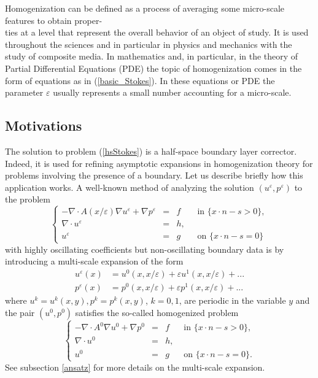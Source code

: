 \documentclass[11pt, reqno]{amsart}
\theoremstyle{definition}
\theoremstyle{remark}
\numberwithin{equation}{section}
\begin{document}
	
	\noindent 	Homogenization can be defined as a process of averaging some micro-scale features  to obtain proper-\\ties at a  level that represent the overall behavior of an object of study. It is used  throughout the sciences and in particular in physics and mechanics with the study of composite media. In  mathematics and, in particular, in the theory of Partial Differential Equations (PDE) the topic of homogenization comes in the form  of equations as in (\ref{basic_Stokes}). In these equations or PDE the parameter $\varepsilon$ usually represents a small number accounting for a micro-scale.
	
	\subsection{Motivations}
	\noindent The solution to problem (\ref{hsStokes}) is a half-space boundary layer corrector. Indeed, it is used for refining asymptotic expansions in homogenization theory for problems involving the presence of a boundary. Let us describe briefly how this application works. A well-known method of analyzing the solution  	$(u^\varepsilon,p^\varepsilon)$ to the problem
		\begin{equation}\label{basic_Stokes}
		\left\{
		\begin{array}{rcll}
			-\nabla\cdot A (x/\varepsilon ) \nabla u^\varepsilon +  \nabla p^\varepsilon&=& f\;  & \mbox{ in } \{ x\cdot n-s>0 \},\\
			\nabla\cdot u^\varepsilon&=& h,\; &\\
			u^\varepsilon&=&g   &\mbox{ on }  \{x\cdot n-s=0\}
		\end{array}
		\right. 
	\end{equation}
	 with highly oscillating coefficients but non-oscillating boundary data	is by introducing a multi-scale expansion  
	of the form 
	\begin{align*}
		u^\varepsilon(x)&=u^0(x,x/\varepsilon)+ \varepsilon
		u^1(x,x/\varepsilon)+...\\
		p^\varepsilon(x)&=  
		p^0(x,x/\varepsilon)+\varepsilon p^1(x,x/\varepsilon)+ ...
	\end{align*}
	where $u^k=u^k(x,y), p^k=p^k(x,y)$, $k=0,1$, are periodic in the variable $y$ and the pair $(u^0,p^0)$ satisfies the so-called homogenized problem
	\begin{equation*}
		\left\{
		\begin{array}{rcll}
			-\nabla\cdot A^0\nabla u^0 +  \nabla p^0&=& f\;  &\mbox{ in } \{ x\cdot n-s>0 \},\\
			\nabla\cdot u^0&=& h,&\\
			u^0&=&g  & \mbox{ on }  \{x\cdot n-s=0\}.
		\end{array}
		\right. 
	\end{equation*}
	See subsection \ref{ansatz} for more details on the multi-scale expansion.\\
	
\end{document}
